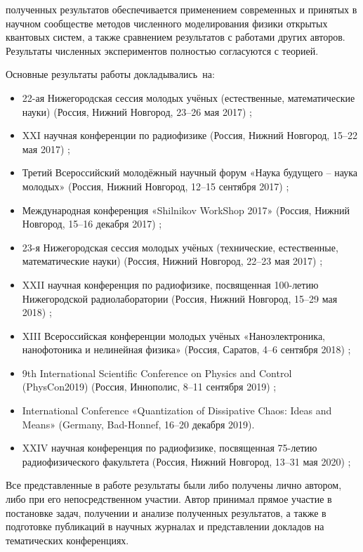 {\reliability} полученных результатов обеспечивается применением современных и принятых в научном сообществе методов численного моделирования физики открытых квантовых систем, а также сравнением результатов с работами других авторов. 
Результаты численных экспериментов полностью согласуются с теорией.

{\probation}
Основные результаты работы докладывались~на:

\begin{itemize}
	\item 22-ая Нижегородская сессия молодых учёных (естественные, математические науки) (Россия, Нижний Новгород, 23--26 мая 2017) \cite{sessiann_2017};
	\item XXI научная конференции по радиофизике (Россия, Нижний Новгород, 15--22 мая 2017) \cite{rf_2017};
	\item Третий Всероссийский молодёжный научный форум «Наука будущего – наука молодых» (Россия, Нижний Новгород, 12--15 сентября 2017) \cite{sfy_2017};
	\item Международная конференция «Shilnikov WorkShop 2017» (Россия, Нижний Новгород, 15--16 декабря 2017) \cite{shilnikov_2017};
	\item 23-я Нижегородская сессия молодых учёных (технические, естественные, математические науки) (Россия, Нижний Новгород, 22--23 мая 2017) \cite{sessiann_2018};
	\item XXII научная конференция по радиофизике, посвященная 100-летию Нижегородской радиолаборатории (Россия, Нижний Новгород, 15--29 мая 2018) \cite{rf_2018};
	\item XIII Всероссийская конференции молодых учёных «Наноэлектроника, нанофотоника и нелинейная физика» (Россия, Саратов, 4--6 сентября 2018) \cite{nnnph_2018};
	\item 9th International Scientific Conference on Physics and Control (PhysCon2019) (Россия, Иннополис, 8--11 сентября 2019) \cite{physcon_2019};
	\item International Conference «Quantization of Dissipative Chaos: Ideas and Means» (Germany, Bad-Honnef, 16--20 декабря 2019).
	\item XXIV научная конференция по радиофизике, посвященная 75-летию радиофизического факультета (Россия, Нижний Новгород, 13--31 мая 2020) \cite{rf_2020};
\end{itemize}

{\contribution} Все представленные в работе результаты были либо
получены лично автором, либо при его непосредственном участии. Автор принимал прямое участие в постановке задач, получении и анализе полученных результатов, а также в подготовке публикаций в научных журналах и представлении докладов на тематических конференциях.

